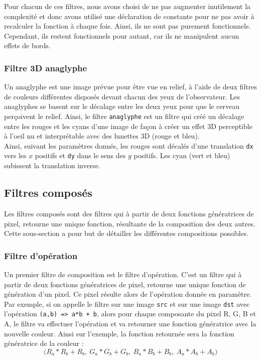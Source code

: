 \documentclass[11pt]{article}
\begin{document}
 Pour chacun de ces filtres, nous avons choisi de ne pas augmenter inutilement la complexité et donc avons utilisé une déclaration de constante pour ne pas avoir à recalculer la fonction à chaque fois. Ainsi, ils ne sont pas purement fonctionnels. Cependant, ils restent fonctionnels pour autant, car ils ne manipulent aucun effets de bords.

\subsubsection{Filtre 3D anaglyphe}

Un anaglyphe est une image prévue pour être vue en relief, à l’aide de deux filtres de couleurs différentes disposés devant chacun des yeux de l’observateur. Les anaglyphes se basent sur le décalage entre les deux yeux pour que le cerveau perçoivent le relief. Ainsi, le filtre \texttt{anaglyphe} est un filtre qui créé un décalage entre les rouges et les cyans d'une image de façon à créer un effet 3D perceptible à l'oeil nu et interprétable avec des lunettes 3D (rouge et bleu). \\

Ainsi, suivant les paramètres donnés, les rouges sont décalés d'une translation \texttt{dx} vers les $x$ positifs et \texttt{dy} dans le sens des $y$ positifs. Les cyan (vert et bleu) subissent la translation inverse. \\

\subsection{Filtres composés}

Les filtres composés sont des filtres qui à partir de deux fonctions génératrices de pixel, retourne une unique fonction, résultante de la composition des deux autres. Cette sous-section a pour but de détailler les différentes compositions possibles.

\subsubsection{Filtre d'opération}

Un premier filtre de composition est le filtre d'opération. C'est un filtre qui à partir de deux fonctions génératrices de pixel, retourne une unique fonction de génération d'un pixel. Ce pixel résulte alors de l'opération donnée en paramètre. \\

\noindent Par exemple, si on appelle le filtre sur une image \texttt{src} et sur une image \texttt{dst} avec l'opération \texttt{(a,b) => a*b + b}, alors pour chaque composante du pixel R, G, B et A, le filtre va effectuer l'opération et va retourner une fonction génératrice avec la nouvelle couleur.
Ainsi sur l'exemple, la fonction retournée sera la fonction génératrice de la couleur :
$$\big( R_a*R_b+R_b,~ G_a*G_b+G_b,~ B_a*B_b+B_b,~ A_a*A_b+A_b \big)$$
\end{document}
